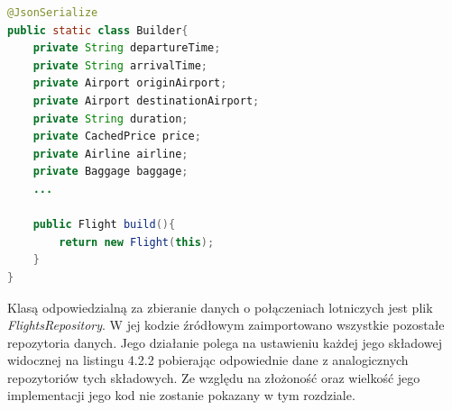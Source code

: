 \documentclass[12pt, twoside]{report}
\begin{document}
\begin{lstlisting}[language=java, caption=Fragment wewnętrznej klasy Builder]
@JsonSerialize
public static class Builder{
    private String departureTime;
    private String arrivalTime;
    private Airport originAirport;
    private Airport destinationAirport;
    private String duration;
    private CachedPrice price;
    private Airline airline;
    private Baggage baggage;
    ...
     
    public Flight build(){
        return new Flight(this);
    }
}
\end{lstlisting}

 \noindent Klasą odpowiedzialną za zbieranie danych o połączeniach lotniczych jest plik \textit{FlightsRepository}. W jej kodzie źródłowym zaimportowano wszystkie pozostałe repozytoria danych. Jego działanie polega na ustawieniu każdej jego składowej widocznej na listingu 4.2.2 pobierając odpowiednie dane z analogicznych repozytoriów tych składowych. Ze względu na złożoność oraz wielkość jego implementacji jego kod nie zostanie pokazany w tym rozdziale.
\end{document}
